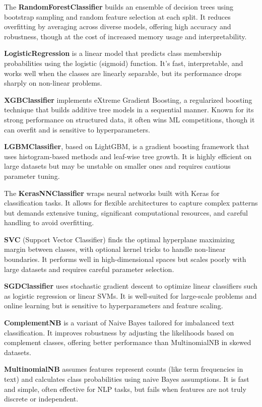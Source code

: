 The {\bf RandomForestClassifier} builds an ensemble of decision trees using bootstrap sampling and random feature selection at each split. It reduces overfitting by averaging across diverse models, offering high accuracy and robustness, though at the cost of increased memory usage and interpretability.

{\bf LogisticRegression} is a linear model that predicts class membership probabilities using the logistic (sigmoid) function. It’s fast, interpretable, and works well when the classes are linearly separable, but its performance drops sharply on non-linear problems.

{\bf XGBClassifier} implements eXtreme Gradient Boosting, a regularized boosting technique that builds additive tree models in a sequential manner. Known for its strong performance on structured data, it often wins ML competitions, though it can overfit and is sensitive to hyperparameters.

{\bf LGBMClassifier}, based on LightGBM, is a gradient boosting framework that uses histogram-based methods and leaf-wise tree growth. It is highly efficient on large datasets but may be unstable on smaller ones and requires cautious parameter tuning.

The {\bf KerasNNClassifier} wraps neural networks built with Keras for classification tasks. It allows for flexible architectures to capture complex patterns but demands extensive tuning, significant computational resources, and careful handling to avoid overfitting.

{\bf SVC} (Support Vector Classifier) finds the optimal hyperplane maximizing margin between classes, with optional kernel tricks to handle non-linear boundaries. It performs well in high-dimensional spaces but scales poorly with large datasets and requires careful parameter selection.

{\bf SGDClassifier} uses stochastic gradient descent to optimize linear classifiers such as logistic regression or linear SVMs. It is well-suited for large-scale problems and online learning but is sensitive to hyperparameters and feature scaling.

{\bf ComplementNB} is a variant of Naive Bayes tailored for imbalanced text classification. It improves robustness by adjusting the likelihoods based on complement classes, offering better performance than MultinomialNB in skewed datasets.

{\bf MultinomialNB} assumes features represent counts (like term frequencies in text) and calculates class probabilities using naive Bayes assumptions. It is fast and simple, often effective for NLP tasks, but fails when features are not truly discrete or independent.

